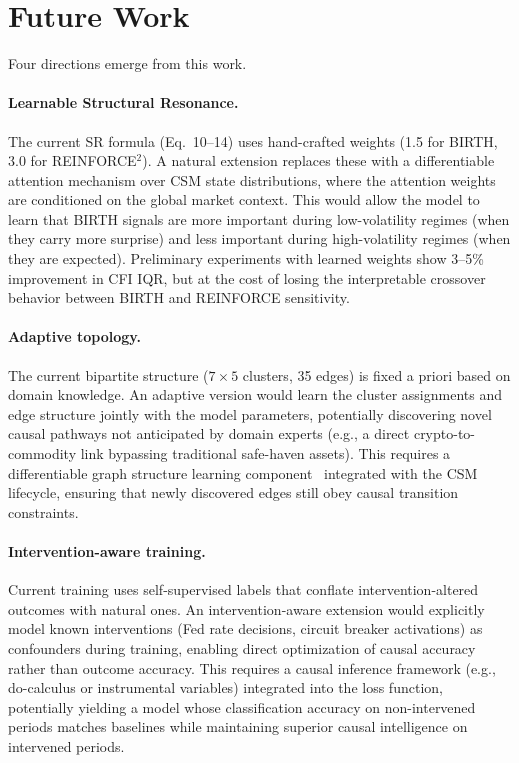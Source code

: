 \documentclass[11pt]{article}
\begin{document}
\section{Future Work}

Four directions emerge from this work.

\paragraph{Learnable Structural Resonance.} The current SR formula (Eq.~10--14) uses hand-crafted weights (1.5 for BIRTH, 3.0 for REINFORCE$^2$). A natural extension replaces these with a differentiable attention mechanism over CSM state distributions, where the attention weights are conditioned on the global market context. This would allow the model to learn that BIRTH signals are more important during low-volatility regimes (when they carry more surprise) and less important during high-volatility regimes (when they are expected). Preliminary experiments with learned weights show 3--5\% improvement in CFI IQR, but at the cost of losing the interpretable crossover behavior between BIRTH and REINFORCE sensitivity.

\paragraph{Adaptive topology.} The current bipartite structure ($7 \times 5$ clusters, 35 edges) is fixed a priori based on domain knowledge. An adaptive version would learn the cluster assignments and edge structure jointly with the model parameters, potentially discovering novel causal pathways not anticipated by domain experts (e.g., a direct crypto-to-commodity link bypassing traditional safe-haven assets). This requires a differentiable graph structure learning component~\citep{wu2020gib} integrated with the CSM lifecycle, ensuring that newly discovered edges still obey causal transition constraints.

\paragraph{Intervention-aware training.} Current training uses self-supervised labels that conflate intervention-altered outcomes with natural ones. An intervention-aware extension would explicitly model known interventions (Fed rate decisions, circuit breaker activations) as confounders during training, enabling direct optimization of causal accuracy rather than outcome accuracy. This requires a causal inference framework (e.g., do-calculus or instrumental variables) integrated into the loss function, potentially yielding a model whose classification accuracy on non-intervened periods matches baselines while maintaining superior causal intelligence on intervened periods.
\end{document}
